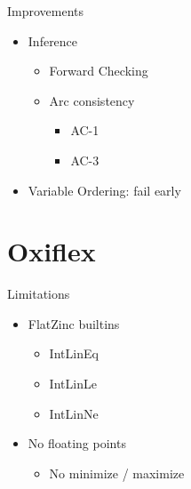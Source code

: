 \documentclass[mathserif,table]{gkibeamer-aaai}
\begin{document}
\begin{frame}{Improvements}
	\begin{itemize}
		\item Inference
		      \pause
		      \begin{itemize}
			      \item Forward Checking
			            \pause
			      \item Arc consistency
			            \pause
			            \begin{itemize}
				            \item AC-1
				                  \pause
				            \item AC-3
			            \end{itemize}
			            \pause
		      \end{itemize}
		\item Variable Ordering: fail early
	\end{itemize}
\end{frame}

\section{Oxiflex}

\begin{frame}
\end{frame}

\begin{frame}{Limitations}
	\begin{itemize}
		\item FlatZinc builtins
		      \pause
		      \begin{itemize}
			      \item IntLinEq
			      \item IntLinLe
			      \item IntLinNe
			            \pause
		      \end{itemize}
		\item No floating points
		      \pause
		      \begin{itemize}
			      \item No minimize / maximize
		      \end{itemize}
	\end{itemize}
\end{frame}
\end{document}
